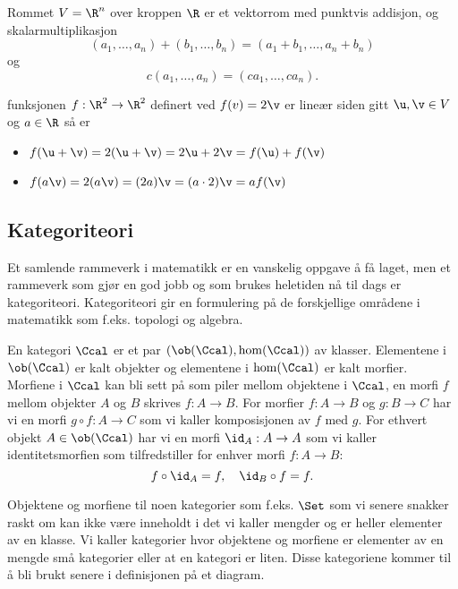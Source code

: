\begin{example}\label{Ex:EukVRom}
    Rommet $V = \R^n$ over kroppen $\R$ er et vektorrom med punktvis addisjon, og skalarmultiplikasjon
    \[(a_1,\dots,a_n)+(b_1,\dots,b_n) = (a_1+b_1,\dots,a_n+b_n)\]
    og
    \[c(a_1,\dots,a_n)=(ca_1,\dots,ca_n).\]
\end{example}

\begin{example}\label{Ex:label}
    funksjonen $f:\R^2\to\R^2$ definert ved $f(v) = 2\v$ er lineær siden gitt $\u,\v\in V$ og $a\in\R$ så er
    \begin{itemize}
        \item $f(\u+\v) = 2(\u+\v) = 2\u+2\v = f(\u)+f(\v)$
        \item $f(a\v) = 2(a\v) = (2a)\v = (a\cdot2)\v = af(\v)$
    \end{itemize}
\end{example}

\subsection{Kategoriteori}\label{Sec:Katgoriteori}
Et samlende rammeverk i matematikk er en vanskelig oppgave å få laget, men et rammeverk som gjør en god jobb og som brukes heletiden nå til dags er kategoriteori. Kategoriteori gir en formulering på de forskjellige områdene i matematikk som f.eks. topologi og algebra.

\begin{definition}\label{Def:Kategori}
    En kategori $\Ccal$ er et par $(\ob(\Ccal),\hom(\Ccal))$ av klasser. Elementene i $\ob(\Ccal)$ er kalt objekter og elementene i $\hom(\Ccal)$ er kalt morfier. Morfiene i $\Ccal$ kan bli sett på som piler mellom objektene i $\Ccal$, en morfi $f$ mellom objekter $A$ og $B$ skrives $f:A\to B$.
    For morfier $f: A\to B$ og $g: B\to C$ har vi en morfi $g\circ f: A\to C$ som vi kaller komposisjonen av $f$ med $g$.
    For ethvert objekt $A\in\ob(\Ccal)$ har vi en morfi $\id_A: A\to A$ som vi kaller identitetsmorfien som tilfredstiller for enhver morfi $f:A\to B$:
    \[f\circ\id_A = f,\quad \id_B\circ f = f.\]
\end{definition}

\begin{remark}\label{rem:smaakat}
  Objektene og morfiene til noen kategorier som f.eks. $\Set$ som
  vi senere snakker raskt om kan ikke være inneholdt i det vi
  kaller mengder og er heller elementer av en klasse. Vi kaller
  kategorier hvor objektene og morfiene er elementer av en mengde
  små kategorier eller at en kategori er liten. Disse kategoriene kommer til å bli brukt senere i definisjonen på et diagram.
\end{remark}


